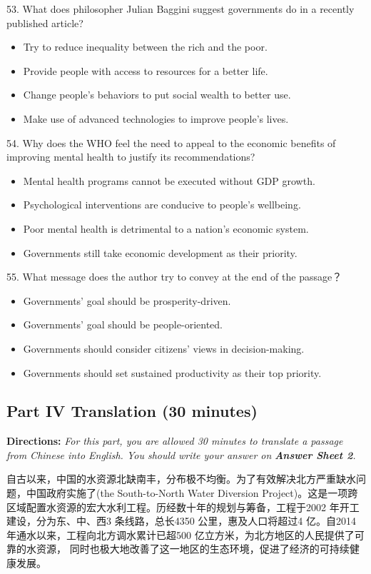 \documentclass[UTF8,11pt]{ctexart}
\begin{document}
53. What does philosopher Julian Baggini suggest governments do in a recently published article?


\begin{itemize}[leftmargin=2em,itemsep=.2em,topsep=.4em]\item[A.] Try to reduce inequality between the rich and the poor.
\item[B.] Provide people with access to resources for a better life.
\item[C.] Change people’s behaviors to put social wealth to better use.
\item[D.] Make use of advanced technologies to improve people’s lives.
\end{itemize}

54. Why does the WHO feel the need to appeal to the economic benefits of improving mental health to justify its recommendations?


\begin{itemize}[leftmargin=2em,itemsep=.2em,topsep=.4em]\item[A.] Mental health programs cannot be executed without GDP growth.
\item[B.] Psychological interventions are conducive to people’s wellbeing.
\item[C.] Poor mental health is detrimental to a nation’s economic system.
\item[D.] Governments still take economic development as their priority.
\end{itemize}

55. What message does the author try to convey at the end of the passage？


\begin{itemize}[leftmargin=2em,itemsep=.2em,topsep=.4em]\item[A.] Governments’ goal should be prosperity-driven.
\item[B.] Governments’ goal should be people-oriented.
\item[C.] Governments should consider citizens’ views in decision-making.
\item[D.] Governments should set sustained productivity as their top priority.
\end{itemize}

\subsection*{\textbf{Part IV Translation} \textbf{(30 minutes)}}


\textbf{Directions: }\textit{For this part, you are allowed 30 minutes to translate a passage from Chinese into English. You should} \textit{write your answer on }\textbf{\textit{Answer Sheet 2}}\textit{.}


自古以来，中国的水资源北缺南丰，分布极不均衡。为了有效解决北方严重缺水问题，中国政府实施了(the South-to-North Water Diversion Project)。这是一项跨区域配置水资源的宏大水利工程。历经数十年的规划与筹备，工程于2002 年开工建设，分为东、中、西3 条线路，总长4350 公里，惠及人口将超过4 亿。自2014 年通水以来，工程向北方调水累计已超500 亿立方米，为北方地区的人民提供了可靠的水资源， 同时也极大地改善了这一地区的生态环境，促进了经济的可持续健康发展。
\end{document}
